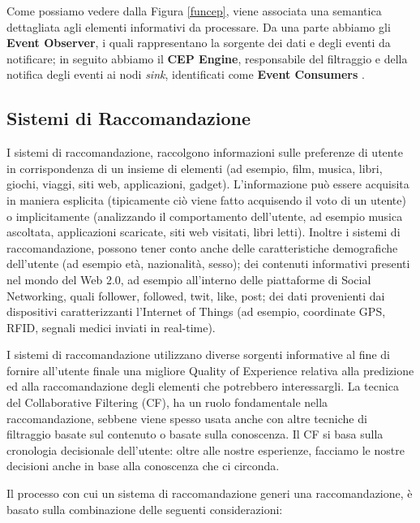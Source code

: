 \documentclass[12pt]{article}
\begin{document}
Come possiamo vedere dalla Figura \ref{funcep}, viene associata una semantica dettagliata agli elementi informativi da processare. Da una parte abbiamo gli \textbf{Event Observer}, i quali rappresentano la sorgente dei dati e degli eventi da notificare; in seguito abbiamo il \textbf{CEP Engine}, responsabile del filtraggio e della notifica degli eventi ai nodi \textit{sink}, identificati come \textbf{Event Consumers} \cite{Cugola:2012:PFI:2187671.2187677,fulop2010survey}.

\subsection{Sistemi di Raccomandazione}
I sistemi di raccomandazione, raccolgono informazioni sulle preferenze di utente in corrispondenza di un insieme di elementi (ad esempio, film, musica, libri, giochi, viaggi, siti web, applicazioni, gadget). L'informazione può essere acquisita in maniera esplicita (tipicamente ciò viene fatto acquisendo il voto di un utente) o implicitamente (analizzando il comportamento dell'utente, ad esempio musica ascoltata, applicazioni scaricate, siti web visitati, libri letti). Inoltre i sistemi di raccomandazione, possono tener conto anche delle caratteristiche demografiche dell'utente (ad esempio età, nazionalità, sesso); dei contenuti informativi presenti nel mondo del Web 2.0, ad esempio all'interno delle piattaforme di Social Networking, quali follower, followed, twit, like, post; dei dati provenienti dai dispositivi caratterizzanti l'Internet of Things (ad esempio, coordinate GPS, RFID, segnali medici inviati in real-time). 

I sistemi di raccomandazione utilizzano diverse sorgenti informative al fine di fornire all'utente finale una migliore Quality of Experience relativa alla predizione ed alla raccomandazione degli elementi che potrebbero interessargli. La tecnica del Collaborative Filtering (CF), ha un ruolo fondamentale nella raccomandazione, sebbene viene spesso usata anche con altre tecniche di filtraggio basate sul contenuto o basate sulla conoscenza. Il CF si basa sulla cronologia decisionale dell'utente: oltre alle nostre esperienze, facciamo le nostre decisioni anche in base alla conoscenza che ci circonda.

Il processo con cui un sistema di raccomandazione generi una raccomandazione, è basato sulla combinazione delle seguenti considerazioni:
\end{document}
